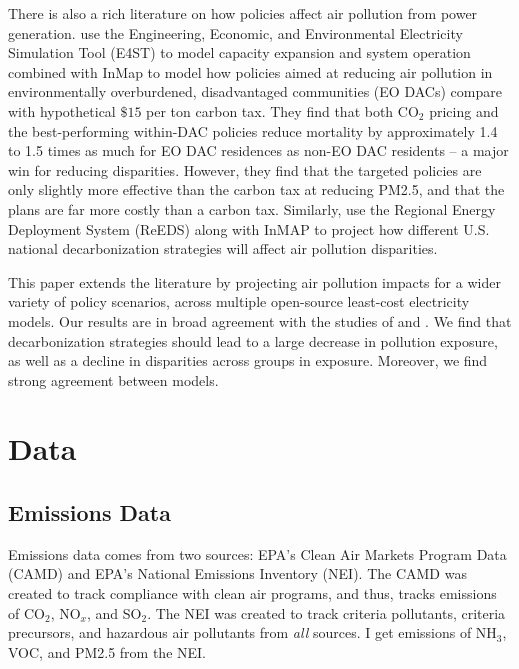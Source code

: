 \documentclass[a4paper]{article}
\theoremstyle{definition}
\theoremstyle{plain}
\begin{document}
There is also a rich literature on how policies affect air pollution from power generation.  \citet{Shawhan2024PoliciesAmericans} use the  Engineering, Economic, and Environmental Electricity Simulation Tool (E4ST) to model capacity expansion and system operation combined with InMap to model how policies aimed at reducing air pollution in environmentally overburdened, disadvantaged communities (EO DACs) compare with hypothetical $\$15$ per ton carbon tax.  They find that both CO$_2$ pricing and the best-performing within-DAC policies reduce mortality by approximately 1.4 to 1.5 times as much for EO DAC residences as non-EO DAC residents -- a major win for reducing disparities.  However, they find that the targeted policies are only slightly more effective than the carbon tax at reducing PM2.5, and that the plans are far more costly than a carbon tax.  Similarly, \citet{Goforth2022AirStrategies} use the Regional Energy Deployment System (ReEDS) along with InMAP to project how different U.S. national decarbonization strategies will affect air pollution disparities.  

This paper extends the literature by projecting air pollution impacts for a wider variety of policy scenarios, across multiple open-source least-cost electricity models.  Our results are in broad agreement with the studies of \citet{Goforth2022AirStrategies} and \citet{Shawhan2024PoliciesAmericans}.  We find that decarbonization strategies should lead to a large decrease in pollution exposure, as well as  a decline in disparities across groups in exposure.  Moreover, we find strong agreement between models.



\section{Data}

\subsection{Emissions Data}
Emissions data comes from two sources: EPA's Clean Air Markets Program Data (CAMD) and EPA's National Emissions Inventory (NEI).  The CAMD was created to track compliance with clean air programs, and thus, tracks emissions of CO$_2$, NO$_x$, and SO$_2$.  The NEI was created to track criteria pollutants, criteria precursors, and hazardous air pollutants from \textit{all} sources.  I get emissions of NH$_3$, VOC, and PM2.5 from the NEI. 
\end{document}
